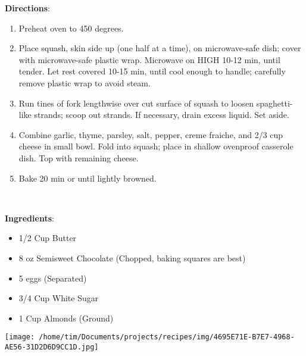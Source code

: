 \documentclass[11pt, twoside, openany]{book}
\begin{document}
\textbf{Directions}:
\vspace{-3mm}\begin{enumerate}\setlength\itemsep{-1mm}
\item Preheat oven to 450 degrees. 
\item Place squash, skin side up (one half at a time), on microwave-safe dish; cover with microwave-safe plastic wrap. Microwave on HIGH 10-12 min, until tender. Let rest covered 10-15 min, until cool enough to handle; carefully remove plastic wrap to avoid steam.
\item Run tines of fork lengthwise over cut surface of squash to loosen spaghetti-like strands; scoop out strands. If necessary, drain excess liquid. Set aside. 
\item Combine garlic, thyme, parsley, salt, pepper, creme fraiche, and 2/3 cup cheese in small bowl. Fold into squash; place in shallow ovenproof casserole dish. Top with remaining cheese.
\item Bake 20 min or until lightly browned.
\end{enumerate}
 \label{flour-less-chocolate-torte-(sachetorte)}\hfill\textit{}\\
\begin{minipage}[t]{0.8\linewidth}
\textbf{Ingredients}:\vspace{-3mm}
\begin{multicols}{2}
\begin{itemize}\setlength\itemsep{-1mm}
\item 1/2 Cup Butter
\item 8 oz Semisweet Chocolate (Chopped, baking squares are best)
\item 5 eggs (Separated)
\item 3/4 Cup White Sugar
\item 1 Cup Almonds (Ground)
\end{itemize}
\end{multicols}
\end{minipage}
\begin{minipage}[t]{0.2\linewidth}
\centering \strut\vspace*{-\baselineskip}\newline
\texttt{[image: /home/tim/Documents/projects/recipes/img/4695E71E-B7E7-4968-AE56-31D2D6D9CC1D.jpg]}\\
\end{minipage}\vspace{3mm}
\end{document}
